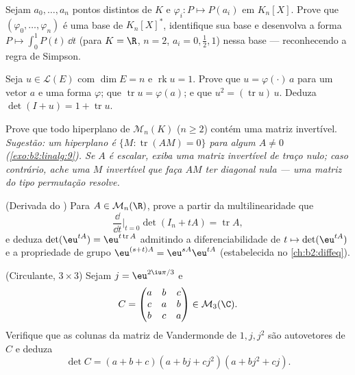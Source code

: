 \begin{exercise}[$\star\star$]\label{exo:b2:linalg:4}
Sejam $a_0, \dots, a_n$ pontos distintos de $K$ e $\varphi_i \colon
P \mapsto P(a_i)$ em $K_n[X]$. Prove que $(\varphi_0, \dots,
\varphi_n)$ é uma base de $K_n[X]^*$, identifique sua base 
e desenvolva a forma $P \mapsto \int_0^1 P(t)\,\dd t$ (para $K = \R$,
$n = 2$, $a_i = 0, \frac12, 1$) nessa base --- reconhecendo
a regra de Simpson.
\end{exercise}

\begin{exercise}[$\star\star$]\label{exo:b2:linalg:5}
Seja $u \in \mathcal{L}(E)$ com $\dim E = n$ e $\operatorname{rk} u
= 1$. Prove que $u = \varphi(\cdot)\, a$ para um vetor $a$ e uma
forma $\varphi$; que $\operatorname{tr} u = \varphi(a)$; e que
$u^2 = (\operatorname{tr} u)\, u$. Deduza $\det(I + u) = 1 +
\operatorname{tr} u$.
\end{exercise}

\begin{exercise}[$\star\star$]\label{exo:b2:linalg:6}
Prove que todo hiperplano de $\mathcal{M}_n(K)$ ($n \geq 2$)
contém uma matriz invertível. \emph{Sugestão: um hiperplano é $\{M :
\operatorname{tr}(AM) = 0\}$ para algum $A \neq 0$
(\cref{exo:b2:linalg:9}). Se $A$ é escalar, exiba uma matriz
invertível de traço nulo; caso contrário, ache uma $M$ invertível que faça
$AM$ ter diagonal nula --- uma matriz do tipo permutação resolve.}
\end{exercise}

\begin{exercise}[$\star\star$]\label{exo:b2:linalg:7}
(Derivada do ) Para $A \in \mathcal{M}_n(\R)$, prove
a partir da multilinearidade que
\[
\frac{\dd}{\dd t}\Big|_{t=0} \det(I_n + tA) = \operatorname{tr} A ,
\]
e deduza $\det(\eu^{tA}) = \eu^{t\operatorname{tr} A}$ admitindo
a diferenciabilidade de $t \mapsto \det(\eu^{tA})$ e a propriedade
de grupo $\eu^{(s+t)A} = \eu^{sA}\eu^{tA}$ (estabelecida no
\cref{ch:b2:diffeq}).
\end{exercise}

\begin{exercise}[$\star\star$]\label{exo:b2:linalg:8}
(Circulante, $3 \times 3$) Sejam $j = \eu^{2\iu\pi/3}$ e
\[
C = \begin{pmatrix}
a & b & c\\
c & a & b\\
b & c & a
\end{pmatrix} \in \mathcal{M}_3(\C).
\]
Verifique que as colunas da matriz de Vandermonde de $1, j, j^2$ são
autovetores de $C$ e deduza
\[
\det C = (a + b + c)(a + bj + cj^2)(a + bj^2 + cj).
\]
\end{exercise}

